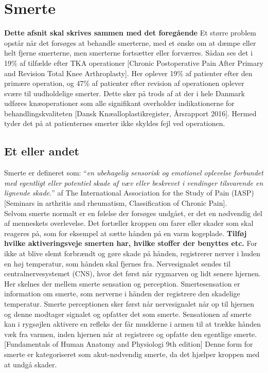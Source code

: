 \section{Smerte}
\textbf{Dette afsnit skal skrives sammen med det foregående}
Et større problem opstår når det forsøges at behandle smerterne, med et ønske om at dæmpe eller helt fjerne smerterne, men smerterne fortsætter eller forværres. Sådan ses det i 19\% af tilfælde efter TKA operationer [Chronic Postoperative Pain After Primary and Revision Total Knee Arthroplasty]. Her oplever 19\% af patienter efter den primære operation, og 47\% af patienter efter revision af operationen oplever svære til uudholdelige smerter. Dette sker på trods af at der i hele Danmark udføres knæoperationer som alle signifikant overholder indikationerne for behandlingskvaliteten [Dansk Knæalloplastikregister, Årsrapport 2016]. Hermed tyder det på at patienternes smerter ikke skyldes fejl ved operationen.


\subsection{Et eller andet}

Smerte er defineret som: “\textit{en ubehagelig sensorisk og emotionel oplevelse forbundet med egentligt eller potentiel skade af væv eller beskrevet i vendinger tilsvarende en lignende skade.}” af The International Association for the Study of Pain (IASP) [Seminars in arthritis and rheumatism, Classification of Chronic Pain].\\
Selvom smerte normalt er en følelse der forsøges undgået, er det en nødvendig del af menneskets overlevelse. Det fortæller kroppen om farer eller skader som skal reageres på, som for eksempel at sætte hånden på en varm kogeplade. \textbf{Tilføj hvilke aktiveringsveje smerten har, hvilke stoffer der benyttes etc.} For ikke at blive slemt forbrændt og gøre skade på hånden, registrerer nerver i huden en høj temperatur, som hånden skal fjernes fra. Nervesignalet sendes til centralnervesystemet (CNS), hvor det først når rygmarven og lidt senere hjernen. Her skelnes der mellem smerte sensation og perception. Smertesensation er information om smerte, som nerverne i hånden der registrere den skadelige temperatur. Smerte perceptionen sker først når nervesignalet når op til hjernen og denne modtager signalet og opfatter det som smerte. Sensationen af smerte kan i rygsøjlen aktivere en refleks der får musklerne i armen til at trække hånden væk fra varmen, inden hjernen når at registrere og opfatte den egentlige smerte. [Fundamentals of Human Anatomy and Physiologi 9th edition] Denne form for smerte er kategoriseret som akut-nødvendig smerte, da det hjælper kroppen med at undgå skader.

